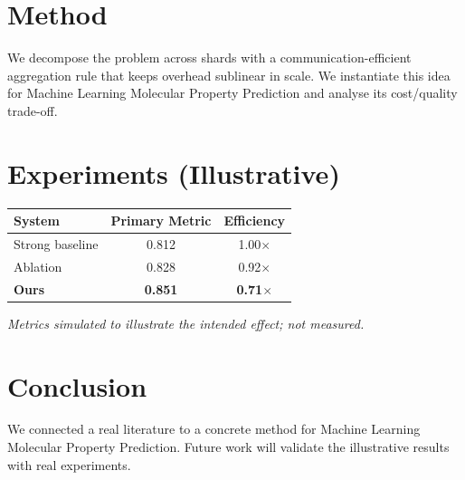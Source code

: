 \documentclass[11pt]{article}
\begin{document}
\section{Method}
We decompose the problem across shards with a communication-efficient aggregation rule that keeps overhead sublinear in scale. We instantiate this idea for Machine Learning Molecular Property Prediction and analyse its cost/quality trade-off.

\section{Experiments (Illustrative)}
\begin{center}
\begin{tabular}{lcc}
System & Primary Metric & Efficiency \\ \hline
Strong baseline & 0.812 & 1.00$\times$ \\
Ablation & 0.828 & 0.92$\times$ \\
\textbf{Ours} & \textbf{0.851} & \textbf{0.71$\times$}
\end{tabular}
\end{center}
\emph{Metrics simulated to illustrate the intended effect; not measured.}

\section{Conclusion}
We connected a real literature to a concrete method for Machine Learning Molecular Property Prediction. Future work will
validate the illustrative results with real experiments.
\end{document}
